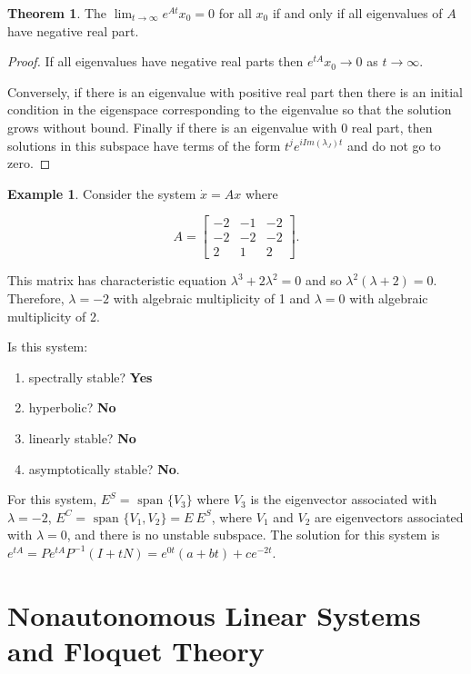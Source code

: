 \documentclass[12pt]{article}
\theoremstyle{definition}
\newtheorem*{example}{Example}
\newtheorem{theorem}{Theorem}[section]  %
\begin{document}
\begin{theorem}
The $\lim_{t \rightarrow \infty} e^{At} x_0 = 0$ for all $x_0$ if and only if all eigenvalues
of $A$ have negative real part.
\end{theorem}

\begin{proof}
If all eigenvalues have negative real parts then $e^{tA} x_0 \rightarrow 0$ as 
$t \rightarrow \infty$.

Conversely, if there is an eigenvalue with positive real part then there is an
initial condition in the eigenspace corresponding to the eigenvalue so that the
solution grows without bound. Finally if there is an eigenvalue with 0 real part,
then solutions in this subspace have terms of the form $t^j e^{i Im(\lambda_J) t}$
and do not go to zero.
\end{proof}

\begin{example}
Consider the system $\dot{x} = Ax$ where 

\[
A =
\begin{bmatrix}
-2 & -1 & -2 \\
-2 & -2 & -2 \\
2 & 1 & 2
\end{bmatrix}.
\]

This matrix has characteristic equation $\lambda^3 + 2 \lambda^2 = 0$ and so
$\lambda^2 (\lambda + 2) = 0$. Therefore, $\lambda = -2$ with algebraic
multiplicity of 1 and $\lambda = 0$ with algebraic multiplicity of 2.

Is this system:
\begin{enumerate}
\item spectrally stable? \textbf{Yes}
\item hyperbolic? \textbf{No}
\item linearly stable? \textbf{No}
\item asymptotically stable? \textbf{No}.
\end{enumerate}

For this system, $E^S = \text{ span } \{ V_3 \}$ where $V_3$ is the eigenvector associated with $\lambda = -2$,
$E^C = \text{ span } \{ V_1, V_2 \} = E \ E^S$, where $V_1$ and $V_2$ are eigenvectors associated with
$\lambda = 0$, and there is no unstable subspace. The solution for this system is
$e^{tA} = P e^{tA} P^{-1} (I + tN) = e^{0t}(a + bt) + ce^{-2t}$.
\end{example}


\section{Nonautonomous Linear Systems and Floquet Theory}
\end{document}

